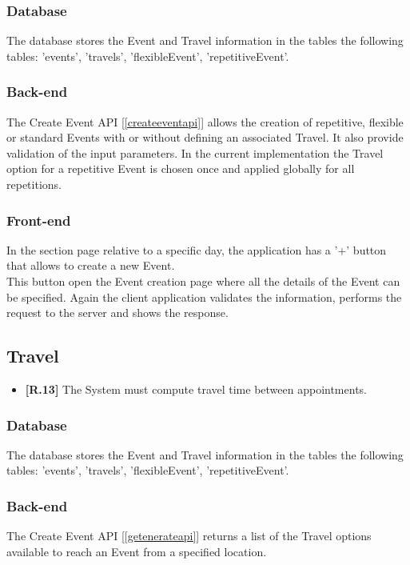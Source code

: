 \subsubsection*{Database}
The database stores the Event and Travel information in the tables the following tables: 'events', 'travels', 'flexibleEvent', 'repetitiveEvent'.

\subsubsection*{Back-end}
The Create Event API [\ref{createeventapi}] allows the creation of repetitive, flexible or standard Events with or without defining an associated Travel.
It also provide validation of the input parameters.
In the current implementation the Travel option for a repetitive Event is chosen once and applied globally for all repetitions.

\subsubsection*{Front-end}
In the section page relative to a specific day, the application has a '+' button that allows to create a new Event.\\
This button open the Event creation page where all the details of the Event can be specified.
Again the client application validates the information, performs the request to the server and shows the response.

\subsection{Travel}
\begin{itemize}
	\item {\color{OliveGreen}\textbf{[R.13]}} The System must compute travel time between appointments.
\end{itemize}

\subsubsection*{Database}
The database stores the Event and Travel information in the tables the following tables: 'events', 'travels', 'flexibleEvent', 'repetitiveEvent'.

\subsubsection*{Back-end}
The Create Event API [\ref{getenerateapi}] returns a list of the Travel options available to reach an Event from a specified location.

